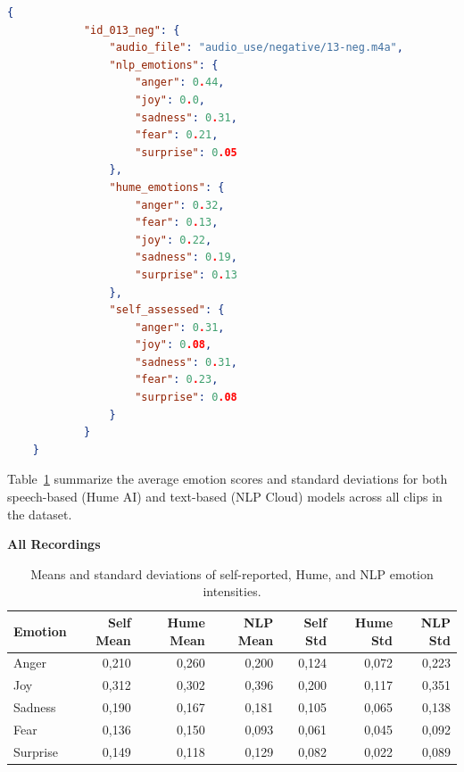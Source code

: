\begin{center}
    \begin{minipage}{0.7\textwidth} 
    \begin{lstlisting}[language=json, caption={Example of stored JSON structure for Hume, NLP, Self-labeling.}]
        {
            "id_013_neg": {
                "audio_file": "audio_use/negative/13-neg.m4a",
                "nlp_emotions": {
                    "anger": 0.44,
                    "joy": 0.0,
                    "sadness": 0.31,
                    "fear": 0.21,
                    "surprise": 0.05
                },
                "hume_emotions": {
                    "anger": 0.32,
                    "fear": 0.13,
                    "joy": 0.22,
                    "sadness": 0.19,
                    "surprise": 0.13
                },
                "self_assessed": {
                    "anger": 0.31,
                    "joy": 0.08,
                    "sadness": 0.31,
                    "fear": 0.23,
                    "surprise": 0.08
                }
            }
    }
    \end{lstlisting}
    \label{tab:json_rq2_rq3}
\end{minipage}
\end{center} 

Table~\ref{tab:rq3_emotion-stats-combined} summarize the average emotion scores and standard deviations for both speech-based (Hume AI) and text-based (NLP Cloud) 
models across all clips in the dataset. 

\begin{table}[H]
    \centering
    \caption*{\textbf{All Recordings}}
    \begin{tabular}{lrrrrrr}
      \toprule
      \textbf{Emotion} & \textbf{Self Mean} & \textbf{Hume Mean} & \textbf{NLP Mean} & \textbf{Self Std} & \textbf{Hume Std} & \textbf{NLP Std} \\
      \midrule
      Anger    & 0,210 & 0,260 & 0,200 & 0,124 & 0,072 & 0,223 \\
      Joy      & 0,312 & 0,302 & 0,396 & 0,200 & 0,117 & 0,351 \\
      Sadness  & 0,190 & 0,167 & 0,181 & 0,105 & 0,065 & 0,138 \\
      Fear     & 0,136 & 0,150 & 0,093 & 0,061 & 0,045 & 0,092 \\
      Surprise & 0,149 & 0,118 & 0,129 & 0,082 & 0,022 & 0,089 \\
      \bottomrule
    \end{tabular}
    \caption{Means and standard deviations of self-reported, Hume, and NLP emotion intensities.}
    \label{tab:rq3_emotion-stats-combined}
  \end{table}
  
